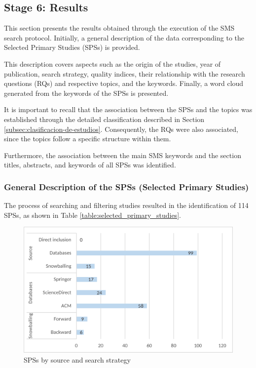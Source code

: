 \subsection{Stage 6: Results}
This section presents the results obtained through the execution of the SMS search protocol. Initially, a general description of the data corresponding to the Selected Primary Studies (SPSs) is provided.

This description covers aspects such as the origin of the studies, year of publication, search strategy, quality indices, their relationship with the research questions (RQs) and respective topics, and the keywords. Finally, a word cloud generated from the keywords of the SPSs is presented.

It is important to recall that the association between the SPSs and the topics was established through the detailed classification described in Section \ref{subsec:clasificacion-de-estudios}. Consequently, the RQs were also associated, since the topics follow a specific structure within them.

Furthermore, the association between the main SMS keywords and the section titles, abstracts, and keywords of all SPSs was identified.

\subsubsection{General Description of the SPSs (Selected Primary Studies)}
The process of searching and filtering studies resulted in the identification of 114 SPSs, as shown in Table \ref{table:selected_primary_studies}.

\begin{figure}[ht]
	\centering
	\includegraphics[scale=0.179]{resources/figures/Imagen1.eps}
	\caption{SPSs by source and search strategy}
	\label{fig:SPSsByProcedence}
\end{figure}

